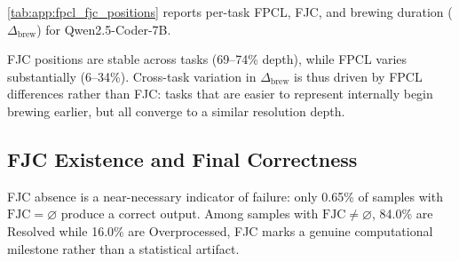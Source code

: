 \cref{tab:app:fpcl_fjc_positions} reports per-task FPCL, FJC, and brewing duration ($\Delta_{\mathrm{brew}}$) for Qwen2.5-Coder-7B.

\begin{table}[H]
\centering
\caption{Per-task FPCL, FJC, and brewing duration ($\Delta_{\mathrm{brew}}$)
for Qwen2.5-Coder-7B. All values in layers (total depth $L=28$);
normalized depth in parentheses.}
\label{tab:app:fpcl_fjc_positions}
\end{table}

FJC positions are stable across tasks (69--74\% depth), while FPCL varies substantially (6--34\%).
Cross-task variation in $\Delta_{\mathrm{brew}}$ is thus driven by FPCL differences rather than FJC: tasks that are easier to represent internally begin brewing earlier, but all converge to a similar resolution depth.

\subsection{FJC Existence and Final Correctness}
\label{app:subsec:fjc_correctness_correlation}

FJC absence is a near-necessary indicator of failure: only 0.65\% of samples with $\mathrm{FJC} = \varnothing$ produce a correct output.
Among samples with $\mathrm{FJC} \neq \varnothing$, 84.0\% are Resolved while 16.0\% are Overprocessed, FJC marks a genuine computational milestone rather than a statistical artifact.
